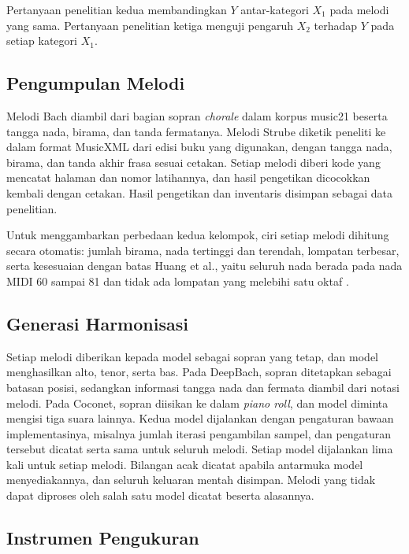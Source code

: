 Pertanyaan penelitian kedua membandingkan $Y$ antar-kategori $X_1$ pada melodi yang sama. Pertanyaan penelitian ketiga menguji pengaruh $X_2$ terhadap $Y$ pada setiap kategori $X_1$.

\subsection{Pengumpulan Melodi}

Melodi Bach diambil dari bagian sopran \textit{chorale} dalam korpus music21 beserta tangga nada, birama, dan tanda fermatanya. Melodi Strube diketik peneliti ke dalam format MusicXML dari edisi buku yang digunakan, dengan tangga nada, birama, dan tanda akhir frasa sesuai cetakan. Setiap melodi diberi kode yang mencatat halaman dan nomor latihannya, dan hasil pengetikan dicocokkan kembali dengan cetakan. Hasil pengetikan dan inventaris disimpan sebagai data penelitian.

Untuk menggambarkan perbedaan kedua kelompok, ciri setiap melodi dihitung secara otomatis: jumlah birama, nada tertinggi dan terendah, lompatan terbesar, serta kesesuaian dengan batas Huang et al., yaitu seluruh nada berada pada nada MIDI 60 sampai 81 dan tidak ada lompatan yang melebihi satu oktaf \parencite{huang2019}.

\subsection{Generasi Harmonisasi}

Setiap melodi diberikan kepada model sebagai sopran yang tetap, dan model menghasilkan alto, tenor, serta bas. Pada DeepBach, sopran ditetapkan sebagai batasan posisi, sedangkan informasi tangga nada dan fermata diambil dari notasi melodi. Pada Coconet, sopran diisikan ke dalam \textit{piano roll}, dan model diminta mengisi tiga suara lainnya. Kedua model dijalankan dengan pengaturan bawaan implementasinya, misalnya jumlah iterasi pengambilan sampel, dan pengaturan tersebut dicatat serta sama untuk seluruh melodi. Setiap model dijalankan lima kali untuk setiap melodi. Bilangan acak dicatat apabila antarmuka model menyediakannya, dan seluruh keluaran mentah disimpan. Melodi yang tidak dapat diproses oleh salah satu model dicatat beserta alasannya.

\subsection{Instrumen Pengukuran}

